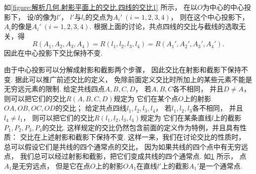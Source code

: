 如\cref{figure:解析几何.射影平面上的交比.四线的交比1} 所示，
在以\(O\)为中心的中心投影下，
设\(l\)的像为\(l'\)，
\(l'\)与\(l_i\)的交点为\(A_i'\ (i=1,2,3,4)\)，
则在这个中心投影下，
\(A_i\)的像是\(A_i'\ (i=1,2,3,4)\).
根据上面的讨论，共点四线的交比与截线的选取无关，得\begin{equation*}
	R(A_1,A_2,A_3,A_4)
	= R(l_1,l_2,l_3,l_4)
	= R(A_1',A_2',A_3',A_4').
\end{equation*}
因此在中心投影下交比保持不变.

由于中心投影可以分解成射影和截影两个步骤，
因此交比在射影和截影下保持不变.
据此可以推广前述交比的定义，
免除前面定义交比时所加上的某些元素不能是无穷远元素的限制.
给定共线四点\(A,B,C,D\)，
若\(A,B,C\)各不相同，
并且\(D \neq A\)，
则可以把它们的交比\(R(A,B,C,D)\)规定为
它们在某个点\(O\)上的射影\(OA,OB,OC,OD\)的交比；
给定共点四线\(l_1,l_2,l_3,l_4\)，
若\(l_1,l_2,l_3\)各不相同，
并且\(l_4 \neq l_1\)，
则可以把它们的交比\(R(l_1,l_2,l_3,l_4)\)规定为
它们在某条直线\(l\)上的截影\(P_1,P_2,P_3,P_4\)的交比.
这样规定的交比仍然包含前面的定义作为特例，并且具有性质：
交比在上述射影和截影下保持不变.
这样一来，我们在讨论交比的性质时，
总可以假设它们是共线的四个通常点的交比，
因为如果共线的四个点中有无穷远点，
我们总可以经过射影和截影，把它们变成共线的四个通常点.
如\cref{figure:解析几何.射影平面上的交比.四线的交比2} 所示，
点\(A_1\)是无穷远点，
但是它在点\(O\)上的射影\(OA_1\)在直线\(l'\)上的截影\(A_1'\)是一个通常点.

\begin{figure}[hbt]
	\centering
	\caption{}
	\label{figure:解析几何.射影平面上的交比.四线的交比2}
\end{figure}
